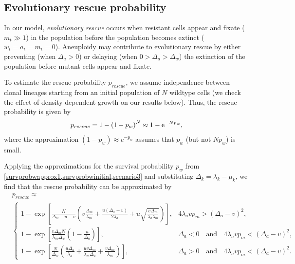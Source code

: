 \documentclass[12pt]{extarticle}
\newcommand{\e}{{\rm e}}
\begin{document}
\subsection*{Evolutionary rescue probability}

In our model, \emph{evolutionary rescue} occurs when resistant cells appear and fixate ($m_t \gg 1$) in the population before the population becomes extinct ($w_t=a_t=m_t=0$).
Aneuploidy may contribute to evolutionary rescue by either preventing (when $\Delta_a>0$) or delaying (when $0>\Delta_a>\Delta_w$) the extinction of the population before mutant cells appear and fixate.

To estimate the rescue probability $p_{rescue}$, we assume independence between clonal lineages starting from an initial population of $N$ wildtype cells (we check the effect of density-dependent growth on our results below).
Thus, the rescue probability is given by 
\begin{equation}\label{rescue_prob}
p_{rescue}=1-\left(1-p_w\right)^N\approx 1-\e^{-Np_w} ,
\end{equation}
where the approximation $(1-p_w)\approx e^{-p_w}$ assumes that $p_w$ (but not $N p_w$) is small.

Applying the approximations for the survival probability $p_w$ from \cref{survprobwapprox1,survprobwinitial,scenario3} and substituting $\Delta_k=\lambda_k-\mu_k$, we find that the rescue probability can be approximated by
\begin{equation}\label{rescue_prob_approx}
\begin{aligned}
&p_{rescue} \approx \\
  &\begin{cases}
  1-\exp\left[\frac{N}{\Delta_w-u-v}\left(v\frac{\Delta_m}{\lambda_m}+\frac{u\left(\Delta_a-v\right)}{2\lambda_a}+u\sqrt{\frac{v\Delta_m}{\lambda_a\lambda_m}}\right)\right] ,&
  4\lambda_avp_m>\left(\Delta_a-v\right)^2 ,\\
   1-\exp\left[\frac{v\Delta_mN}{\lambda_m\Delta_w}\left(1-\frac{u}{\Delta_a}\right)\right] ,&
   \Delta_a<0\quad\text{and}\quad4\lambda_avp_m<\left(\Delta_a-v\right)^2 ,\\
   1-\exp\left[\frac{N}{\Delta_w}\left(\frac{u\Delta_a}{\lambda_a}+\frac{uv\Delta_m}{\lambda_m\Delta_a}+\frac{v\Delta_m}{\lambda_m}\right)\right] ,&
   \Delta_a>0\quad\text{and}\quad4\lambda_avp_m<\left(\Delta_a-v\right)^2 .
  \end{cases}
\end{aligned}
\end{equation}
\end{document}
